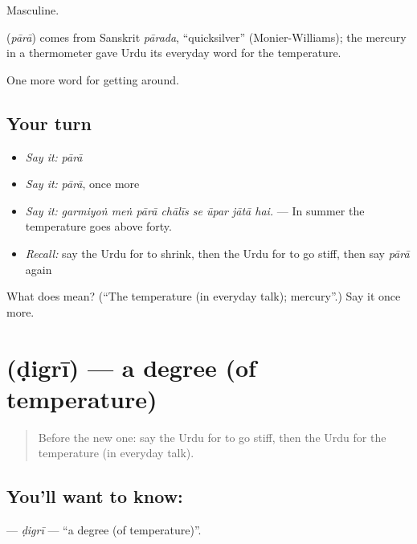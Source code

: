 Masculine.

\begin{cousinweb}
\textbf{} (\emph{pārā}) comes from Sanskrit \emph{pārada}, \textquotedblleft{}quicksilver\textquotedblright{} (Monier-Williams); the mercury in a thermometer gave Urdu its everyday word for the temperature.
\end{cousinweb}

\begin{grammarlens}[title={What you've built}]
One more word for getting around.
\end{grammarlens}

\subsection*{Your turn}
\begin{itemize}
\raggedright
  \item \emph{Say it:} \emph{pārā}
  \item \emph{Say it:} \emph{pārā}, once more
  \item \emph{Say it:} \emph{garmiyoṅ meṅ pārā chālīs se ūpar jātā hai.} — In summer the temperature goes above forty.
  \item \emph{Recall:} say the Urdu for to shrink, then the Urdu for to go stiff, then say \emph{pārā} again
\end{itemize}

\begin{tcolorbox}[breakable,colback=teal!4,colframe=teal!35!black,title={Before you move on}]
What does  mean? (\textquotedblleft{}The temperature (in everyday talk); mercury\textquotedblright{}.) Say it once more.
\end{tcolorbox}
\section[\texorpdfstring{\ur{ڈگری} (ḍigrī)}{ڈگری (ḍigrī)}]{ (ḍigrī) — a degree (of temperature)}

\label{lesson:UR-C430-digri}



\begin{quote}
Before the new one: say the Urdu for to go stiff, then the Urdu for the temperature (in everyday talk).
\end{quote}

\subsection*{You'll want to know: }
\textbf{} — \emph{ḍigrī} — \textquotedblleft{}a degree (of temperature)\textquotedblright{}.

